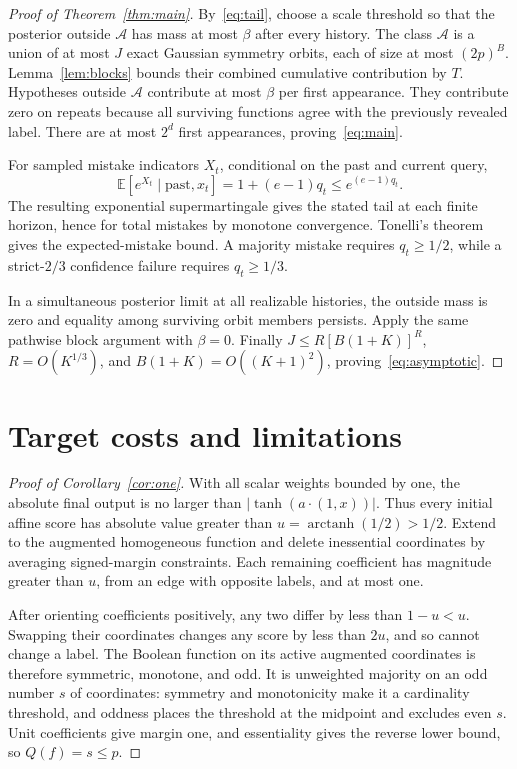 \documentclass[11pt]{article}
\newcommand{\E}{\mathbb E}
\begin{document}
\begin{proof}[Proof of Theorem~\ref{thm:main}]
By~\eqref{eq:tail}, choose a scale threshold so that the posterior outside $\mathcal A$ has mass at most $\beta$ after every history. The class $\mathcal A$ is a union of at most $J$ exact Gaussian symmetry orbits, each of size at most $(2p)^B$. Lemma~\ref{lem:blocks} bounds their combined cumulative contribution by $T$. Hypotheses outside $\mathcal A$ contribute at most $\beta$ per first appearance. They contribute zero on repeats because all surviving functions agree with the previously revealed label. There are at most $2^d$ first appearances, proving~\eqref{eq:main}.

For sampled mistake indicators $X_t$, conditional on the past and current query,
\[
 \E[e^{X_t}\mid\text{past},x_t]
 =1+(e-1)q_t\le e^{(e-1)q_t}.
\]
The resulting exponential supermartingale gives the stated tail at each finite horizon, hence for total mistakes by monotone convergence. Tonelli's theorem gives the expected-mistake bound. A majority mistake requires $q_t\ge1/2$, while a strict-$2/3$ confidence failure requires $q_t\ge1/3$.

In a simultaneous posterior limit at all realizable histories, the outside mass is zero and equality among surviving orbit members persists. Apply the same pathwise block argument with $\beta=0$. Finally $J\le R[B(1+K)]^R$, $R=O(K^{1/3})$, and $B(1+K)=O((K+1)^2)$, proving~\eqref{eq:asymptotic}.
\end{proof}



\section{Target costs and limitations}
\begin{proof}[Proof of Corollary~\ref{cor:one}]
With all scalar weights bounded by one, the absolute final output is no larger than $|\tanh(a\cdot(1,x))|$. Thus every initial affine score has absolute value greater than $u=\operatorname{arctanh}(1/2)>1/2$. Extend to the augmented homogeneous function and delete inessential coordinates by averaging signed-margin constraints. Each remaining coefficient has magnitude greater than $u$, from an edge with opposite labels, and at most one.

After orienting coefficients positively, any two differ by less than $1-u<u$. Swapping their coordinates changes any score by less than $2u$, and so cannot change a label. The Boolean function on its active augmented coordinates is therefore symmetric, monotone, and odd. It is unweighted majority on an odd number $s$ of coordinates: symmetry and monotonicity make it a cardinality threshold, and oddness places the threshold at the midpoint and excludes even $s$. Unit coefficients give margin one, and essentiality gives the reverse lower bound, so $Q(f)=s\le p$.
\end{proof}
\end{document}
